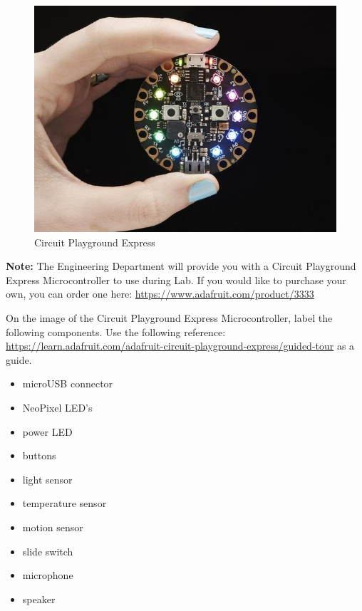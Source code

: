 \documentclass[11pt]{article}
\makeatletter
\def\maxwidth{\ifdim\Gin@nat@width>\linewidth\linewidth
    \else\Gin@nat@width\fi}
\let\Oldincludegraphics\includegraphics
\renewcommand{\includegraphics}[1]{\Oldincludegraphics[width=.8\maxwidth]{#1}}
\providecommand{\tightlist}{%
      \setlength{\itemsep}{0pt}\setlength{\parskip}{0pt}}
\makeatother
\begin{document}
    \begin{figure}
\centering
\includegraphics{images/circuit_playground_cpx02.jpg}
\caption{Circuit Playground Express}
\end{figure}

    \textbf{Note:} The Engineering Department will provide you with a
Circuit Playground Express Microcontroller to use during Lab. If you
would like to purchase your own, you can order one here:
\url{https://www.adafruit.com/product/3333}

    On the image of the Circuit Playground Express Microcontroller, label
the following components. Use the following reference:
\url{https://learn.adafruit.com/adafruit-circuit-playground-express/guided-tour}
as a guide.

\begin{itemize}
\tightlist
\item
  microUSB connector
\item
  NeoPixel LED's
\item
  power LED
\item
  buttons
\item
  light sensor
\item
  temperature sensor
\item
  motion sensor
\item
  slide switch
\item
  microphone
\item
  speaker
\end{itemize}
\end{document}
